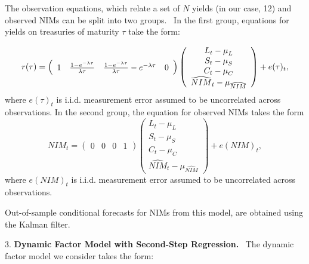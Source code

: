 \documentclass[12pt]{article}
\begin{document}
\bigskip

{\normalsize The observation equations, which relate a set of $N$ yields (in
our case, 12) and observed NIMs can be split into two groups. \ In the first
group, equations for yields on treasuries of maturity }$\tau $ take the form:

\begin{equation*}
r(\tau )=\left(
\begin{array}{cccc}
1 & \frac{1-e^{-\lambda \tau }}{\lambda \tau } & \frac{1-e^{-\lambda \tau }}{%
\lambda \tau }-e^{-\lambda \tau } & 0%
\end{array}%
\right) \left(
\begin{array}{c}
{L_{t}-\mu _{L}} \\
{S_{t}-\mu _{S}} \\
{C_{t}-\mu _{C}} \\
\widehat{NIM}_{t}-\mu _{\widehat{NIM}}%
\end{array}%
\right) +e(\tau )_{t},
\end{equation*}%
where $e(\tau )_{t}$ is i.i.d. measurement error assumed to be uncorrelated
across observations. \bigskip In the second group, the equation for observed
NIMs takes the form%
\begin{equation*}
NIM_{t}=\left(
\begin{array}{cccc}
0 & 0 & 0 & 1%
\end{array}%
\right) \left(
\begin{array}{c}
{L_{t}-\mu _{L}} \\
{S_{t}-\mu _{S}} \\
{C_{t}-\mu _{C}} \\
\widehat{NIM}_{t}-\mu _{\widehat{NIM}}%
\end{array}%
\right) +e(NIM)_{t},
\end{equation*}%
where $e(NIM)_{t}$ is i.i.d. measurement error assumed to be uncorrelated
across observations. \bigskip

Out-of-sample conditional forecasts for NIMs from this model, are obtained
using the Kalman filter.

3. \textbf{Dynamic Factor Model with Second-Step Regression.} \ The dynamic
factor model we consider takes the form:
\end{document}
